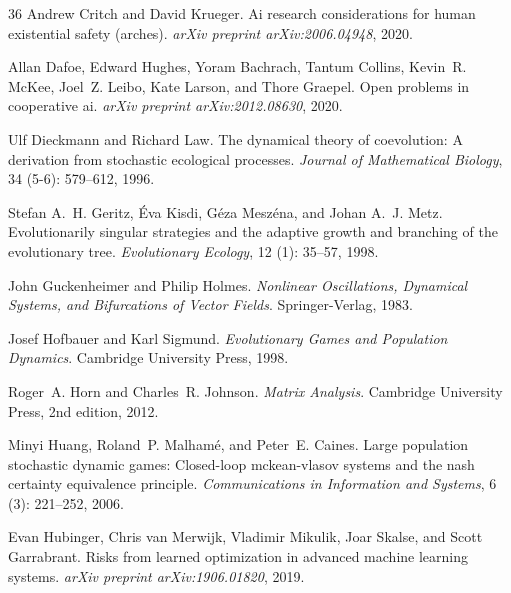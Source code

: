\documentclass[12pt]{article}
\begin{document}
\begin{thebibliography}{36}
Andrew Critch and David Krueger.
\newblock Ai research considerations for human existential safety (arches).
\newblock \emph{arXiv preprint arXiv:2006.04948}, 2020.

Allan Dafoe, Edward Hughes, Yoram Bachrach, Tantum Collins, Kevin~R. McKee,
  Joel~Z. Leibo, Kate Larson, and Thore Graepel.
\newblock Open problems in cooperative ai.
\newblock \emph{arXiv preprint arXiv:2012.08630}, 2020.

Ulf Dieckmann and Richard Law.
\newblock The dynamical theory of coevolution: A derivation from stochastic
  ecological processes.
\newblock \emph{Journal of Mathematical Biology}, 34 (5-6):
  579--612, 1996.

Stefan A.~H. Geritz, {\'E}va Kisdi, G{\'e}za Mesz{\'e}na, and Johan A.~J. Metz.
\newblock Evolutionarily singular strategies and the adaptive growth and
  branching of the evolutionary tree.
\newblock \emph{Evolutionary Ecology}, 12 (1): 35--57, 1998.

John Guckenheimer and Philip Holmes.
\newblock \emph{Nonlinear Oscillations, Dynamical Systems, and Bifurcations of
  Vector Fields}.
\newblock Springer-Verlag, 1983.

Josef Hofbauer and Karl Sigmund.
\newblock \emph{Evolutionary Games and Population Dynamics}.
\newblock Cambridge University Press, 1998.

Roger~A. Horn and Charles~R. Johnson.
\newblock \emph{Matrix Analysis}.
\newblock Cambridge University Press, 2nd edition, 2012.

Minyi Huang, Roland~P. Malham{\'e}, and Peter~E. Caines.
\newblock Large population stochastic dynamic games: Closed-loop mckean-vlasov
  systems and the nash certainty equivalence principle.
\newblock \emph{Communications in Information and Systems}, 6
  (3): 221--252, 2006.

Evan Hubinger, Chris van Merwijk, Vladimir Mikulik, Joar Skalse, and Scott
  Garrabrant.
\newblock Risks from learned optimization in advanced machine learning systems.
\newblock \emph{arXiv preprint arXiv:1906.01820}, 2019.


\end{thebibliography}
\end{document}
